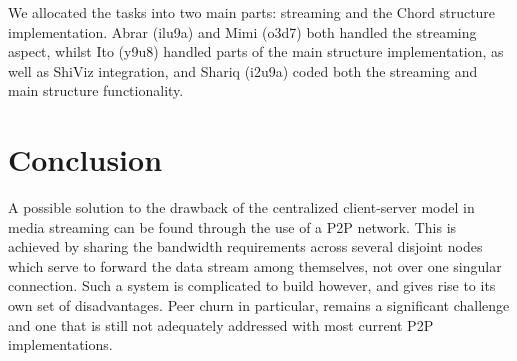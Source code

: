 \documentclass[fleqn,24pt]{SelfArx} %
\begin{document}
We allocated the tasks into two main parts: streaming and the Chord structure implementation. Abrar (ilu9a) and Mimi (o3d7) both handled the streaming aspect, whilst Ito (y9u8) handled parts of the main structure implementation, as well as ShiViz integration, and Shariq (i2u9a) coded both the streaming and main structure functionality.


\section{Conclusion}

A possible solution to the drawback of the centralized client-server model in media streaming can be found through the use of a P2P network. This is achieved by sharing the bandwidth requirements across several disjoint nodes which serve to forward the data stream among themselves, not over one singular connection. Such a system is complicated to build however, and gives rise to its own set of disadvantages. Peer churn in particular, remains a significant challenge and one that is still not adequately addressed with most current P2P implementations.




\end{document}
